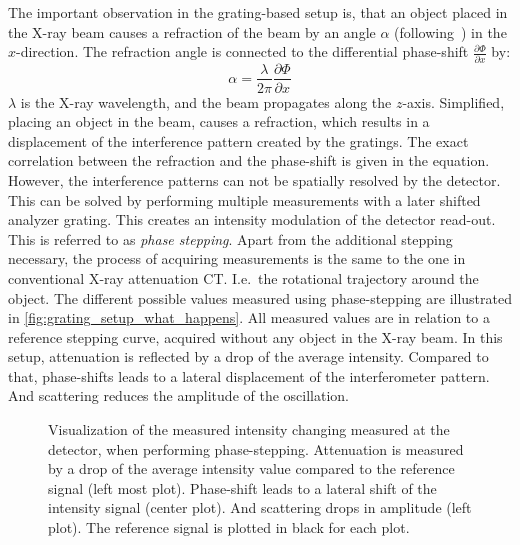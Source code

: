 The important observation in the grating-based setup is, that an object placed in the X-ray beam
causes a refraction of the beam by an angle \(\alpha\) (following~\cite{donath_inverse_2009}) in the
\(x\)-direction. The refraction angle is connected to the differential phase-shift \(\frac{\partial
	\Phi}{\partial x}\) by:
\begin{equation}
	\alpha = \frac{\lambda}{2 \pi} \frac{\partial \Phi}{\partial x}
\end{equation}
\(\lambda\) is the X-ray wavelength, and the beam propagates along the \(z\)-axis. Simplified,
placing an object in the beam, causes a refraction, which results in a displacement of the
interference pattern created by the gratings. The exact correlation between the refraction and the
phase-shift is given in the equation. However, the interference patterns can not be spatially
resolved by the detector. This can be solved by performing multiple measurements with a later
shifted analyzer grating. This creates an intensity modulation of the detector read-out. This is
referred to as \textit{phase stepping}. Apart from the additional stepping necessary, the process of
acquiring measurements is the same to the one in conventional X-ray attenuation CT\@. I.e.\ the
rotational trajectory around the object. The different possible values measured using phase-stepping
are illustrated in \autoref{fig:grating_setup_what_happens}. All measured values are in relation to
a reference stepping curve, acquired without any object in the X-ray beam. In this setup,
attenuation is reflected by a drop of the average intensity. Compared to that, phase-shifts leads to
a lateral displacement of the interferometer pattern. And scattering reduces the amplitude of the
oscillation.

\begin{figure}
	\centering
	\caption{Visualization of the measured intensity changing measured at the detector, when
		performing phase-stepping. Attenuation is measured by a drop of the average
		intensity value compared to the reference signal (left most plot). Phase-shift leads
		to a lateral shift of the intensity signal (center plot). And scattering drops in
		amplitude (left plot). The reference signal is plotted in black for each plot.}%
	\label{fig:grating_setup_what_happens}
\end{figure}

